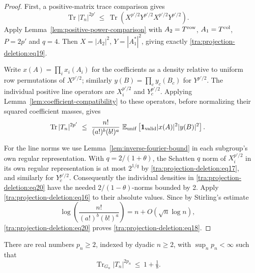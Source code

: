 \begin{proof}\label{tra:projection-deletion:recursion-proof}
\label{tra:projection-deletion:interpolation-and-fourth-trace}
First, a positive-matrix trace comparison gives
\begin{equation}
\operatorname{Tr}|T_n|^{2p'}\ \le\ 
\operatorname{Tr}\left(X^{p'/2}Y^{p'/2}X^{p'/2}Y^{p'/2}\right).
\label{tra:projection-deletion:eq19}
\end{equation}
Apply Lemma~\ref{lem:positive-power-comparison} with
$A_2=T^{\rm row}$, $A_1=T^{\rm col}$, $P=2p'$ and $q=4$.
Then $X=|A_2|^2$, $Y=|A_1^*|^2$, giving exactly
\eqref{tra:projection-deletion:eq19}.

Write \(x(A)=\prod_i x_i(A_i)\) for the coefficients as a density relative to uniform row permutations of \(X^{p'/2}\); similarly \(y(B)=\prod_c y_c(B_c)\) for \(Y^{p'/2}\). The individual positive line operators are
$X_i^{p'/2}$ and $Y_c^{p'/2}$. Applying
Lemma~\ref{lem:coefficient-compatibility} to these operators, before
normalizing their squared coefficient masses, gives
\begin{equation}
\operatorname{Tr}|T_n|^{2p'}\ \le\
\frac{n!}{(a!)^b (b!)^a}
  \ \mathbb E_{\rm unif}\left[\mathbf 1_{\rm valid}|x(A)|^2 |y(B)|^2\right].
\label{tra:projection-deletion:eq20}
\end{equation}

For the line norms we use Lemma~\ref{lem:inverse-fourier-bound}
in each subgroup's own regular representation.
With \(q=2/(1+\theta)\), the Schatten \(q\) norm of \(X_i^{p'/2}\) in its own regular representation is at most \(2^{1/q}\) by \eqref{tra:projection-deletion:eq17}, and similarly for \(Y_c^{p'/2}\). Consequently the individual densities in \eqref{tra:projection-deletion:eq20} have the needed \(2/(1-\theta)\)-norms bounded by 2. Apply \eqref{tra:projection-deletion:eq16} to their absolute values. Since by Stirling's estimate
\[
\log\left(\frac{n!}{(a!)^b(b!)^a}\right)=n+O(\sqrt n\log n),
\]
\eqref{tra:projection-deletion:eq20} proves \eqref{tra:projection-deletion:eq18}.
\end{proof}
\begin{theorem}\label{tra:projection-deletion:moment}
There are real numbers $p_n\ge2$, indexed by dyadic $n\ge2$, with $\sup_n p_n<\infty$ such that
\label{tra:projection-deletion:main-statement}
\begin{equation}
\operatorname{Tr}_{G_n}|T_n|^{2p_n}\ \le\ 1+\tfrac{1}{8}.
\label{tra:projection-deletion:eq1}
\end{equation}
\end{theorem}

